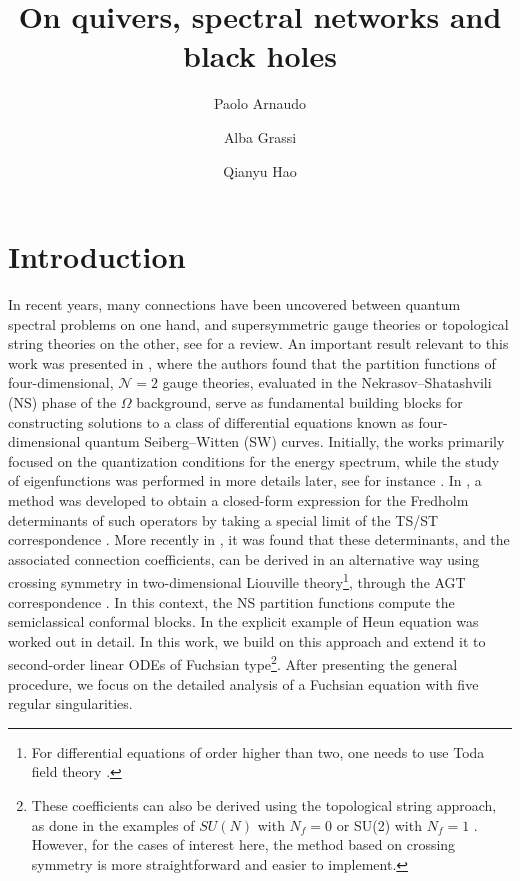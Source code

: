 \documentclass[11pt]{article}
\title{On quivers, spectral networks and black holes}
\author[a]{Paolo Arnaudo}
\author[b,c]{Alba Grassi}
\author[b]{Qianyu Hao}
\affiliation[a]{Mathematical Sciences and STAG Research Centre, \\ University of Southampton, Highfield, Southampton SO17 1BJ, UK}
\affiliation[b]{Section de Math\'ematiques, Universit\'e de Gen\`eve, 1211 Gen\`eve 4, Switzerland}
\affiliation[c]{Theoretical Physics Department, CERN, 1211 Geneva 23, Switzerland }
\numberwithin{equation}{section}
\begin{document}
\maketitle

\flushbottom

\section{Introduction}


In recent years, many connections have been uncovered between quantum spectral problems on one hand, and supersymmetric gauge theories or topological string theories on the other, see \cite{Marino:2015nla} for a review.
An important result relevant to this work was presented in \cite{ns}, where the authors found that the partition functions of four-dimensional, $\mathcal{N}=2$  gauge theories, evaluated in the Nekrasov--Shatashvili (NS) phase of the $\Omega$ background, serve as fundamental building blocks for constructing solutions to a class of differential equations known as four-dimensional quantum Seiberg--Witten (SW) curves.  Initially, the works \cite{ns,mirmor,mirmor2,Zenkevich2011,Nekrasov:2011bc} primarily focused on the quantization conditions for the energy spectrum, while the study of eigenfunctions was performed in more details later, see for instance \cite{Kozlowski:2010tv,Alday:2010vg,Kanno:2011fw,Jeong:2021rll,Jeong:2023qdr,Jeong:2018qpc,Jeong:2017pai, Alday:2009fs,Drukker:2009id}. In \cite{Grassi:2019coc,Grassi:2021wpw}, a method was developed to obtain a closed-form expression for the Fredholm determinants of such operators by taking a special limit of the TS/ST correspondence \cite{ghm}. More recently in \cite{Bonelli:2022ten}, it was found that these determinants, and the associated connection coefficients, can be derived in an alternative  way using crossing symmetry in two-dimensional Liouville theory\footnote{For differential equations of order higher than two, one needs to use Toda field theory \cite{Wyllard:2009hg}.}, through the AGT correspondence \cite{Alday:2009aq}. In this context, the NS  partition functions compute  the semiclassical conformal blocks.
%
In \cite{Bonelli:2022ten} the explicit example of Heun equation  was worked out in detail.
In this work, we build on this approach and extend it to second-order linear ODEs of Fuchsian type\footnote{These coefficients can also be derived using the topological string approach, as done in the examples of $SU(N)$ with $N_f = 0$ \cite{Grassi:2019coc} or SU(2) with $N_f = 1$  \cite{Grassi:2021wpw}. However, for the cases of interest here, the method based on crossing symmetry \cite{Bonelli:2022ten} is more straightforward and easier to implement.}.  After presenting the general procedure, we focus on the detailed analysis of a Fuchsian equation with five regular singularities. 
\end{document}
